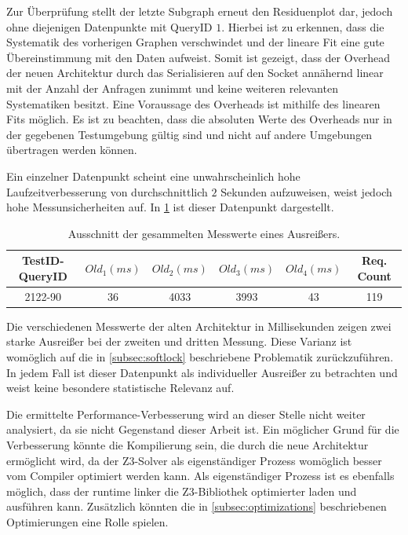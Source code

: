 Zur Überprüfung stellt der letzte Subgraph erneut den Residuenplot dar, jedoch ohne diejenigen Datenpunkte mit QueryID $1$.
Hierbei ist zu erkennen, dass die Systematik des vorherigen Graphen verschwindet und der lineare Fit eine gute Übereinstimmung mit den Daten aufweist.
Somit ist gezeigt, dass der Overhead der neuen Architektur durch das Serialisieren auf den Socket annähernd linear mit der Anzahl der Anfragen zunimmt
und keine weiteren relevanten Systematiken besitzt. Eine Voraussage des Overheads ist mithilfe des linearen Fits möglich.
Es ist zu beachten, dass die absoluten Werte des Overheads nur in der gegebenen Testumgebung gültig sind und nicht auf andere Umgebungen übertragen werden können.

Ein einzelner Datenpunkt scheint eine unwahrscheinlich hohe Laufzeitverbesserung von durchschnittlich $2$ Sekunden aufzuweisen, weist jedoch hohe Messunsicherheiten auf.
In \cref{tab:broken-datapoint} ist dieser Datenpunkt dargestellt.

\begin{table}[!htp]
    \centering
    \caption{Ausschnitt der gesammelten Messwerte eines Ausreißers.}
    \label{tab:broken-datapoint}
    \begin{tabular}{ cccccc }
        \toprule
        \textbf{TestID-QueryID} & \textbf{$Old_1(ms)$} & \textbf{$Old_2(ms)$} & \textbf{$Old_3(ms)$} & \textbf{$Old_4(ms)$} & \textbf{Req. Count} \\
        \midrule
        2122-90                 & 36                   & 4033                 & 3993                 & 43                   & 119                 \\
        \bottomrule
    \end{tabular}
\end{table}

Die verschiedenen Messwerte der alten Architektur in Millisekunden zeigen zwei starke Ausreißer bei der zweiten und dritten Messung.
Diese Varianz ist womöglich auf die in \cref{subsec:softlock} beschriebene Problematik zurückzuführen.
In jedem Fall ist dieser Datenpunkt als individueller Ausreißer zu betrachten und weist keine besondere statistische Relevanz auf.

Die ermittelte Performance-Verbesserung wird an dieser Stelle nicht weiter analysiert, da sie nicht Gegenstand dieser Arbeit ist.
Ein möglicher Grund für die Verbesserung könnte die Kompilierung sein, die durch die neue Architektur ermöglicht wird,
da der Z3-Solver als eigenständiger Prozess womöglich besser vom Compiler optimiert werden kann.
Als eigenständiger Prozess ist es ebenfalls möglich, dass der runtime linker die Z3-Bibliothek optimierter laden und ausführen kann.
Zusätzlich könnten die in \cref{subsec:optimizations} beschriebenen Optimierungen eine Rolle spielen.
